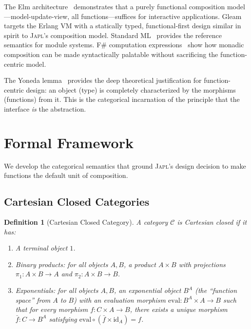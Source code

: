 \documentclass[11pt,a4paper]{article}
\newtheorem{definition}[theorem]{Definition}
\newcommand{\japl}{\textsc{Japl}}
\newcommand{\id}{\mathrm{id}}
\begin{document}
The Elm architecture~\citep{czaplicki2012elm} demonstrates that a purely functional composition model---model-update-view, all functions---suffices for interactive applications. Gleam~\citep{gleam2024} targets the Erlang VM with a statically typed, functional-first design similar in spirit to \japl{}'s composition model. Standard ML~\citep{milner1997definition} provides the reference semantics for module systems. F\# computation expressions~\citep{petricek2014fsharp,syme2011fsharp} show how monadic composition can be made syntactically palatable without sacrificing the function-centric model.

The Yoneda lemma~\citep{yoneda1954note,maclane1971categories} provides the deep theoretical justification for function-centric design: an object (type) is completely characterized by the morphisms (functions) from it. This is the categorical incarnation of the principle that the interface \emph{is} the abstraction.


\section{Formal Framework}
\label{sec:formal-framework}

We develop the categorical semantics that ground \japl{}'s design decision to make functions the default unit of composition.

\subsection{Cartesian Closed Categories}

\begin{definition}[Cartesian Closed Category]
A category $\mathcal{C}$ is \emph{Cartesian closed} if it has:
\begin{enumerate}
  \item A terminal object $1$.
  \item Binary products: for all objects $A, B$, a product $A \times B$ with projections $\pi_1 : A \times B \to A$ and $\pi_2 : A \times B \to B$.
  \item Exponentials: for all objects $A, B$, an exponential object $B^A$ (the ``function space'' from $A$ to $B$) with an evaluation morphism $\mathrm{eval} : B^A \times A \to B$ such that for every morphism $f : C \times A \to B$, there exists a unique morphism $\bar{f} : C \to B^A$ satisfying $\mathrm{eval} \circ (\bar{f} \times \id_A) = f$.
\end{enumerate}
\end{definition}
\end{document}
